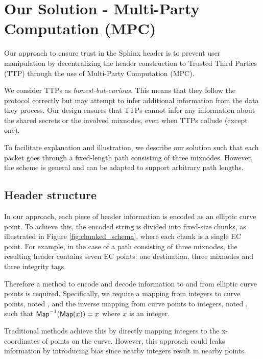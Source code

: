 \section{Our Solution - Multi-Party Computation (MPC)}\label{sec:scheme}

Our approach to ensure trust in the Sphinx header is to prevent user manipulation by decentralizing the header construction to Trusted Third Parties (TTP) through the use of Multi-Party Computation (MPC).
\newline

We consider TTPs as \textit{honest-but-curious}.
This means that they follow the protocol correctly but may attempt to infer additional information from the data they process.
Our design ensures that TTPs cannot infer any information about the shared secrets  or the involved mixnodes, even when TTPs collude (except one).
\newline

To facilitate explanation and illustration, we describe our solution such that each packet goes through a fixed-length path consisting of three mixnodes.
However, the scheme is general and can be adapted to support arbitrary path lengths. 


\subsection{Header structure}

In our approach, each piece of header information is encoded as an elliptic curve point. 
To achieve this, the encoded string is divided into fixed-size chunks, as illustrated in Figure \ref{fig:chunked_schema}, where each chunk is a single EC point. 
For example, in the case of a path consisting of three mixnodes, the resulting header contains seven EC points: one destination, three mixnodes and three integrity tags.

Therefore a method to encode and decode information to and from elliptic curve points is required. 
Specifically, we require a mapping from integers to curve points, noted \Map{}, and the inverse mapping from curve points to integers, noted \InverseMap{}, 
such that $\InverseMap{\Map{x}} = x$ where $x$ is an integer.

Traditional methods achieve this by directly mapping integers to the x-coordinates of points on the curve. 
However, this approach could leaks information by introducing bias since nearby integers result in nearby points.

